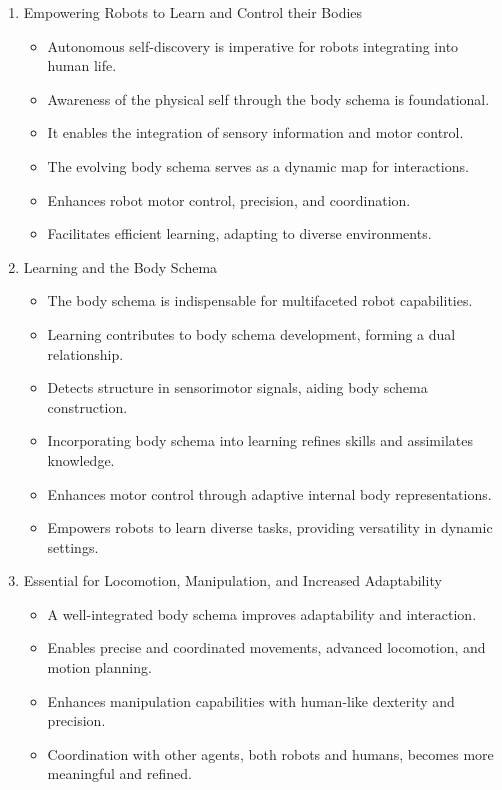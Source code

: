 \documentclass[12pt, a4paper]{article}
\begin{document}
\begin{enumerate}
	\item Empowering Robots to Learn and Control their Bodies
	\begin{itemize}
		\item Autonomous self-discovery is imperative for robots integrating into human life.
		\item Awareness of the physical self through the body schema is foundational.
		\item It enables the integration of sensory information and motor control.
		\item The evolving body schema serves as a dynamic map for interactions.
		\item Enhances robot motor control, precision, and coordination.
		\item Facilitates efficient learning, adapting to diverse environments.
	\end{itemize} 
	\item Learning and the Body Schema
	\begin{itemize}
		\item The body schema is indispensable for multifaceted robot capabilities.
		\item Learning contributes to body schema development, forming a dual relationship.
		\item Detects structure in sensorimotor signals, aiding body schema construction.
		\item Incorporating body schema into learning refines skills and assimilates knowledge.
		\item Enhances motor control through adaptive internal body representations.
		\item Empowers robots to learn diverse tasks, providing versatility in dynamic settings.
	\end{itemize}
	\item Essential for Locomotion, Manipulation, and Increased Adaptability
	\begin{itemize}
		\item A well-integrated body schema improves adaptability and interaction.
		\item Enables precise and coordinated movements, advanced locomotion, and motion planning.
		\item Enhances manipulation capabilities with human-like dexterity and precision.
		\item Coordination with other agents, both robots and humans, becomes more meaningful and refined.

\end{itemize}
\end{enumerate}
\end{document}
